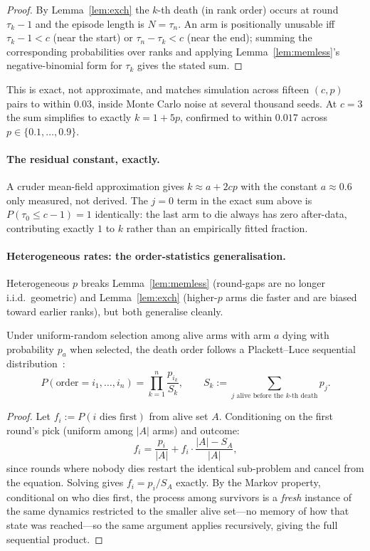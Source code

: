 \begin{proof}
By Lemma~\ref{lem:exch} the $k$-th death (in rank order) occurs at round
$\tau_k - 1$ and the episode length is $N=\tau_n$. An arm is positionally
unusable iff $\tau_k - 1 < c$ (near the start) or $\tau_n - \tau_k < c$ (near the
end); summing the corresponding probabilities over ranks and applying
Lemma~\ref{lem:memless}'s negative-binomial form for $\tau_k$ gives the stated
sum.
\end{proof}

This is exact, not approximate, and matches simulation across fifteen $(c,p)$
pairs to within $0.03$, inside Monte Carlo noise at several thousand seeds. At
$c=3$ the sum simplifies to exactly $k = 1 + 5p$, confirmed to within $0.017$
across $p \in \{0.1,\dots,0.9\}$.

\paragraph{The residual constant, exactly.} A cruder mean-field
approximation gives $k \approx a + 2cp$ with the constant $a \approx
0.6$ only measured, not derived. The $j{=}0$ term in the exact sum above is
$P(\tau_0 \le c{-}1) = 1$ identically: the last arm to die always has zero
after-data, contributing exactly $1$ to $k$ rather than an empirically fitted
fraction.

\paragraph{Heterogeneous rates: the order-statistics generalisation.}
Heterogeneous $p$ breaks Lemma~\ref{lem:memless} (round-gaps are no longer
i.i.d.\ geometric) and Lemma~\ref{lem:exch} (higher-$p$ arms die faster and are
biased toward earlier ranks), but both generalise cleanly.

\begin{lemma}
\label{lem:hetexch}
Under uniform-random selection among alive arms with arm $a$ dying with
probability $p_a$ when selected, the death order follows a Plackett--Luce
sequential distribution~\citep{plackett1975,luce1959}:
\[
P(\text{order}=i_1,\dots,i_n) = \prod_{k=1}^{n} \frac{p_{i_k}}{S_k}, \qquad
S_k := \sum_{j \text{ alive before the $k$-th death}} p_j.
\]
\end{lemma}

\begin{proof}
Let $f_i := P(i \text{ dies first})$ from alive set $A$. Conditioning on the
first round's pick (uniform among $|A|$ arms) and outcome:
\[
f_i = \frac{p_i}{|A|} + f_i\cdot\frac{|A|-S_A}{|A|},
\]
since rounds where nobody dies restart the identical sub-problem and cancel
from the equation. Solving gives $f_i = p_i/S_A$ exactly. By the Markov
property, conditional on who dies first, the process among survivors is a
\emph{fresh} instance of the same dynamics restricted to the smaller alive
set---no memory of how that state was reached---so the same argument applies
recursively, giving the full sequential product.
\end{proof}

